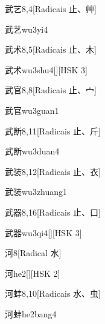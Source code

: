 \begin{entry}{武艺}{8,4}[Radicais ⽌、⾋]
  \begin{phonetics}{武艺}{wu3yi4}
  \end{phonetics}
\end{entry}

\begin{entry}{武术}{8,5}[Radicais ⽌、⽊]
  \begin{phonetics}{武术}{wu3shu4}[][HSK 3]
  \end{phonetics}
\end{entry}

\begin{entry}{武官}{8,8}[Radicais ⽌、⼧]
  \begin{phonetics}{武官}{wu3guan1}
  \end{phonetics}
\end{entry}

\begin{entry}{武断}{8,11}[Radicais ⽌、⽄]
  \begin{phonetics}{武断}{wu3duan4}
  \end{phonetics}
\end{entry}

\begin{entry}{武装}{8,12}[Radicais ⽌、⾐]
  \begin{phonetics}{武装}{wu3zhuang1}
  \end{phonetics}
\end{entry}

\begin{entry}{武器}{8,16}[Radicais ⽌、⼝]
  \begin{phonetics}{武器}{wu3qi4}[][HSK 3]
  \end{phonetics}
\end{entry}

\begin{entry}{河}{8}[Radical ⽔]
  \begin{phonetics}{河}{he2}[][HSK 2]
  \end{phonetics}
\end{entry}

\begin{entry}{河蚌}{8,10}[Radicais ⽔、⾍]
  \begin{phonetics}{河蚌}{he2bang4}
  \end{phonetics}
\end{entry}

